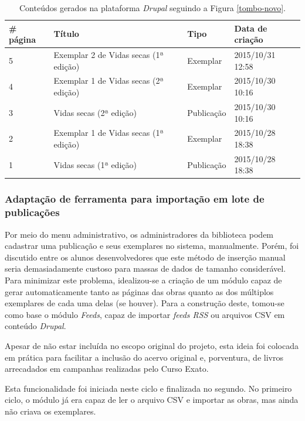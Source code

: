 \documentclass[a4paper]{article}
\begin{document}
\begin{table}[hc]
\centering
\caption{Conteúdos gerados na plataforma \textit{Drupal} seguindo a Figura \ref{tombo-novo}.\label{tabela-tombo-novo}}
\begin{tabular}{llll}
\hline
\# página & Título                                & Tipo       & Data de criação  \\ \hline
5         & Exemplar 2 de Vidas secas (1ª edição) & Exemplar   & 2015/10/31 12:58 \\ \hline
4         & Exemplar 1 de Vidas secas (2ª edição) & Exemplar   & 2015/10/30 10:16 \\ \hline
3         & Vidas secas (2ª edição)               & Publicação & 2015/10/30 10:16 \\ \hline
2         & Exemplar 1 de Vidas secas (1ª edição) & Exemplar   & 2015/10/28 18:38 \\ \hline
1         & Vidas secas (1ª edição)               & Publicação & 2015/10/28 18:38 \\ \hline
\end{tabular}
\end{table}


\subsubsection{Adaptação de ferramenta para importação em lote de publicações}
Por meio do menu administrativo, os administradores da biblioteca podem cadastrar uma publicação e seus exemplares no sistema, manualmente. Porém, foi discutido entre os alunos desenvolvedores que este método de inserção manual seria demasiadamente custoso para massas de dados de tamanho considerável. Para minimizar este problema, idealizou-se a criação de um módulo capaz de gerar automaticamente tanto as páginas das obras quanto as dos múltiplos exemplares de cada uma delas (se houver). Para a construção deste, tomou-se como base o módulo \textit{Feeds}, capaz de importar \textit{feeds RSS} ou arquivos CSV em conteúdo \textit{Drupal}.

Apesar de não estar incluída no escopo original do projeto, esta ideia foi colocada em prática para facilitar a inclusão do acervo original e, porventura, de livros arrecadados em campanhas realizadas pelo Curso Exato.

Esta funcionalidade foi iniciada neste ciclo e finalizada no segundo. No primeiro ciclo, o módulo já era capaz de ler o arquivo CSV e importar as obras, mas ainda não criava os exemplares.
\end{document}
